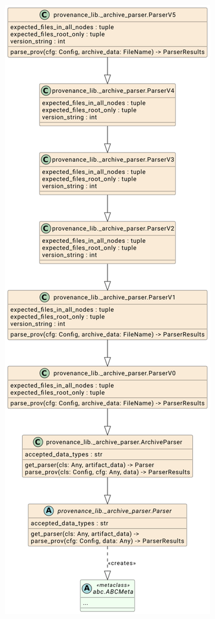 \begin{figure}[htp]
    \begin{minipage}[c]{0.5\textwidth}
        \includegraphics[width=\textwidth]{figures/archiveParserUML.png}

\end{minipage}
\end{figure}
